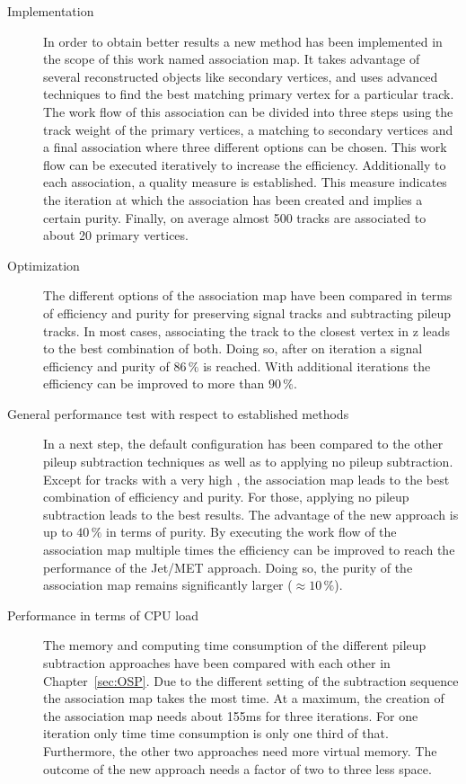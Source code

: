 \begin{description}

\item[Implementation] In order to obtain better results a new method has been implemented in the scope of this work named association map. It takes advantage of several reconstructed objects like secondary vertices, and uses advanced techniques to find the best matching primary vertex for a particular track. The work flow of this association can be divided into three steps using the track weight of the primary vertices, a matching to secondary vertices and a final association where three different options can be chosen. This work flow can be executed iteratively to increase the efficiency. Additionally to each association, a quality measure is established. This measure indicates the iteration at which the association has been created and implies a certain purity. Finally, on average almost 500 tracks are associated to about 20 primary vertices.

\item[Optimization] The different options of the association map have been compared in terms of efficiency and purity for preserving signal tracks and subtracting pileup tracks. In most cases, associating the track to the closest vertex in z leads to the best combination of both. Doing so, after on iteration a signal efficiency and purity of $86\,\%$ is reached. With additional iterations the efficiency can be improved to more than $90\,\%$.

\item[General performance test with respect to established methods] In a next step, the default configuration has been compared to the other pileup subtraction techniques as well as to applying no pileup subtraction. Except for tracks with a very high \pt{}, the association map leads to the best combination of efficiency and purity. For those, applying no pileup subtraction leads to the best results. The advantage of the new approach is up to $40\,\%$ in terms of purity. By executing the work flow of the association map multiple times the efficiency can be improved to reach the performance of the Jet/MET approach. Doing so, the purity of the association map remains significantly larger ($\approx10\,\%$).

\item[Performance in terms of CPU load] The memory and computing time consumption of the different pileup subtraction approaches have been compared with each other in Chapter~\ref{sec:OSP}. Due to the different setting of the subtraction sequence the association map takes the most time. At a maximum, the creation of the association map needs about 155\unit{ms} for three iterations. For one iteration only time time consumption is only one third of that. Furthermore, the other two approaches need more virtual memory. The outcome of the new approach needs a factor of two to three less space.


\end{description}
